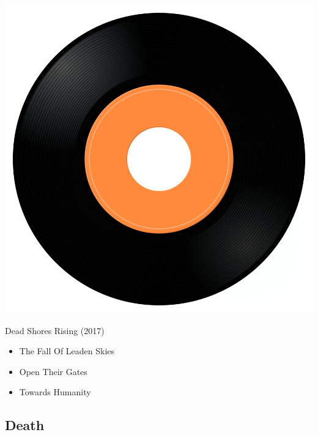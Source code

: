 \begin{minipage}[t]{0.25\textwidth}\vspace{0pt}
\captionsetup{type=figure}
\includegraphics[width=\textwidth]{Images/cover.png}
\caption*{Dead Shores Rising (2017)}
\end{minipage}
\begin{minipage}[t]{0.25\textwidth}\vspace{0pt}
\begin{itemize}[nosep,leftmargin=1em,labelwidth=*,align=left]
	\setlength{\itemsep}{0pt}
	\item The Fall Of Leaden Skies
	\item Open Their Gates
	\item Towards Humanity
\end{itemize}
\end{minipage}

\subsection{Death}

